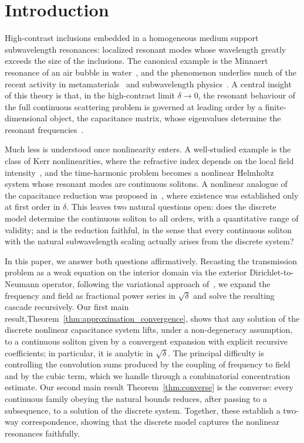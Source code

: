 \documentclass[a4paper,reqno,twoside]{amsart}
\numberwithin{equation}{section}
\theoremstyle{definition}
\newcommand{\<}{\ensuremath \leq}
\renewcommand{\>}{\ensuremath \geq}
\begin{document}
\section{Introduction}\label{sec:intro}
High-contrast inclusions embedded in a homogeneous medium support subwavelength
resonances: localized resonant modes whose wavelength greatly exceeds the size
of the inclusions. The canonical example is the Minnaert resonance of an air
bubble in water~\cite{minnaert1933XVI, ammariMinnaert2018}, and the phenomenon underlies much of
the recent activity in metamaterials~\cite{davies2025roadmap} and subwavelength
physics~\cite{cbms}. A central insight of this theory is
that, in the high-contrast limit $\delta \to 0$, the resonant behaviour of the
full continuous scattering problem is governed at leading order by a
finite-dimensional object, the capacitance matrix, whose eigenvalues determine
the resonant frequencies~\cite{ammari.davies.ea2024Functional}. 
 
Much less is understood once nonlinearity enters. A well-studied example\cite{angermann2023radiation,evequoz2015dual,griesmaier2022inverse} is the class of Kerr nonlinearities, where the refractive index depends on the local field
intensity~\cite{gorbach2009spatial}, and the time-harmonic problem becomes a
nonlinear Helmholtz system whose resonant modes are continuous solitons. 
A nonlinear analogue of the capacitance reduction was proposed
in~\cite{ammari2025analysis}, where existence was established only at first order
in $\delta$. This leaves two natural questions open: does the discrete model
determine the continuous soliton to all orders, with a quantitative range of
validity; and is the reduction faithful, in the sense that every continuous
soliton with the natural subwavelength scaling actually arises from the discrete
system?
 
In this paper, we answer both questions affirmatively. Recasting the transmission
problem as a weak equation on the interior domain via the exterior
Dirichlet-to-Neumann operator, following the variational approach
of~\cite{feppon.cheng.ea2023Subwavelength, fepponSubwavelength2024, angermann2023radiation}, we expand the frequency and
field as fractional power series in $\sqrt{\delta}$ and solve the resulting
cascade recursively. Our first main result,Theorem~\ref{thm:approximation_convergence}, shows
that any solution of the discrete nonlinear capacitance system lifts, under a
non-degeneracy assumption, to a continuous soliton given by a convergent
expansion with explicit recursive coefficients; in particular, it is analytic in $\sqrt{\delta}$. The principal
difficulty is controlling the convolution sums produced by the coupling of
frequency to field and by the cubic term, which we handle through a
combinatorial concentration estimate. Our second main result
Theorem~\ref{thm:converse} is the converse: every continuous family obeying
the natural bounds reduces, after passing to a subsequence, to a solution of the
discrete system. Together, these establish a two-way correspondence, showing that
the discrete model captures the nonlinear resonances faithfully.
 
\end{document}
